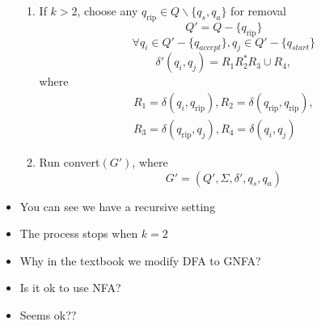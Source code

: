 \begin{frame}[allowframebreaks]
\begin{itemize}
\begin{enumerate}
  \item If $k > 2$, choose any $q_{\text{rip}} \in Q \backslash \{q_s,
    q_a\}$ for removal
\begin{equation*}
  Q'
=Q - \{q_{\text{rip}}\}
\end{equation*}
\begin{equation*}
  \forall q_i \in Q' - \{q_{accept}\},
q_j \in Q' - \{q_{start}\}
\end{equation*}
\begin{equation*}
  \delta'(q_i,q_j)
= R_1 R_2^* R_3 \cup R_4,
\end{equation*}
where
\begin{gather*}
R_1=\delta(q_i,q_{\text{rip}}),
R_2=\delta(q_{\text{rip}},q_{\text{rip}}),
\\
R_3 =\delta(q_{\text{rip}},q_j), 
R_4=\delta(q_i,q_j)
\end{gather*}

\item Run convert$(G')$, where
  \begin{equation*}
    G' =
(Q', \Sigma, \delta', q_s, q_a)
  \end{equation*}
  \end{enumerate}
\item You can see we have a recursive setting
\item [] The process stops when $k=2$
\item Why in the textbook we modify DFA to GNFA?
\item [] Is it ok to use NFA?

\item [] Seems ok?? 
\end{itemize}\end{frame}







